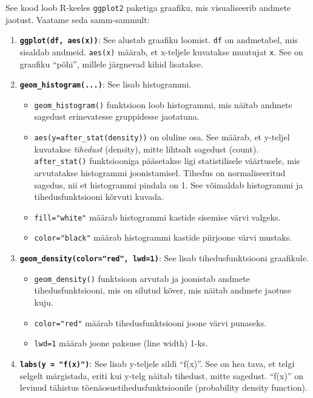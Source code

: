 \documentclass[
]{book}
\providecommand{\tightlist}{%
  \setlength{\itemsep}{0pt}\setlength{\parskip}{0pt}}
\begin{document}
See kood loob R-keeles \texttt{ggplot2} paketiga graafiku, mis visualiseerib andmete jaotust. Vaatame seda samm-sammult:

\begin{enumerate}
\def\labelenumi{\arabic{enumi}.}
\item
  \textbf{\texttt{ggplot(df,\ aes(x))}}: See alustab graafiku loomist. \texttt{df} on andmetabel, mis sisaldab andmeid. \texttt{aes(x)} määrab, et x-teljele kuvatakse muutujat \texttt{x}. See on graafiku ``põhi'', millele järgnevad kihid lisatakse.
\item
  \textbf{\texttt{geom\_histogram(...)}}: See lisab histogrammi.

  \begin{itemize}
  \tightlist
  \item
    \texttt{geom\_histogram()} funktsioon loob histogrammi, mis näitab andmete sagedust erinevatesse gruppidesse jaotatuna.
  \item
    \texttt{aes(y=after\_stat(density))} on oluline osa. See määrab, et y-teljel kuvatakse \emph{tihedust} (density), mitte lihtsalt sagedust (count). \texttt{after\_stat()} funktsiooniga pääsetakse ligi statistilisele väärtusele, mis arvutatakse histogrammi joonistamisel. Tihedus on normaliseeritud sagedus, nii et histogrammi pindala on 1. See võimaldab histogrammi ja tihedusfunktsiooni kõrvuti kuvada.
  \item
    \texttt{fill="white"} määrab histogrammi kastide sisemise värvi valgeks.
  \item
    \texttt{color="black"} määrab histogrammi kastide piirjoone värvi mustaks.
  \end{itemize}
\item
  \textbf{\texttt{geom\_density(color="red",\ lwd=1)}}: See lisab tihedusfunktsiooni graafikule.

  \begin{itemize}
  \tightlist
  \item
    \texttt{geom\_density()} funktsioon arvutab ja joonistab andmete tihedusfunktsiooni, mis on silutud kõver, mis näitab andmete jaotuse kuju.
  \item
    \texttt{color="red"} määrab tihedusfunktsiooni joone värvi punaseks.
  \item
    \texttt{lwd=1} määrab joone paksuse (line width) 1-ks.
  \end{itemize}
\item
  \textbf{\texttt{labs(y\ =\ "f(x)")}}: See lisab y-teljele sildi ``f(x)''. See on hea tava, et telgi selgelt märgistada, eriti kui y-telg näitab tihedust, mitte sagedust. ``f(x)'' on levinud tähistus tõenäosustihedusfunktsioonile (probability density function).
\end{enumerate}
\end{document}
